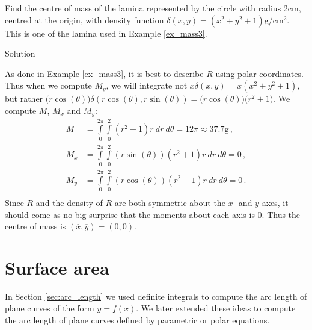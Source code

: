 \begin{example}\label{ex_mass8}
Find the centre of mass of the lamina represented by the circle with radius 2cm, centred at the origin, with density function $\delta(x,y) = (x^2+y^2+1)$g/cm$^2$. This is one of the lamina used in Example \ref{ex_mass3}.

Solution 

As done in Example \ref{ex_mass3}, it is best to describe $R$ using polar coordinates.
Thus when we compute $M_y$, we will integrate not $x\delta(x,y) = x(x^2+y^2+1)$, but rather $\big(r\cos(\theta)\big)\delta(r\cos(\theta),r\sin(\theta))$\linebreak $= \big(r\cos(\theta)\big)\big(r^2+1\big).$ We compute $M$, $M_x$ and $M_y$:
\allowdisplaybreaks
\begin{align*}
M &= \int\limits_0^{2\pi}\int\limits_0^2 (r^2+1)r\ dr\ d\theta = 12\pi\approx 37.7\text{g}\,,\\
M_x &= \int\limits_0^{2\pi}\int\limits_0^2 (r\sin(\theta))(r^2+1)r \ dr\ d\theta = 0\,,\\
M_y &= \int\limits_0^{2\pi}\int\limits_0^2 (r\cos(\theta))(r^2+1)r \ dr\ d\theta = 0\,.\\
\end{align*}
Since $R$ and the density of $R$ are both symmetric about the $x$- and $y$-axes, it should come as no big surprise that the moments about each axis is 0. Thus the centre of mass is $(\overline{x},\overline{y})=(0,0)$. 
\end{example}

\section{Surface area}\label{sec:surface_area}
	\checkoddpage
{}
In Section \ref{sec:arc_length} we used definite integrals to compute the arc length of plane curves of the form \linebreak $y=f(x)$. We later extended these ideas to compute the arc length of plane curves defined by parametric or polar equations. 

